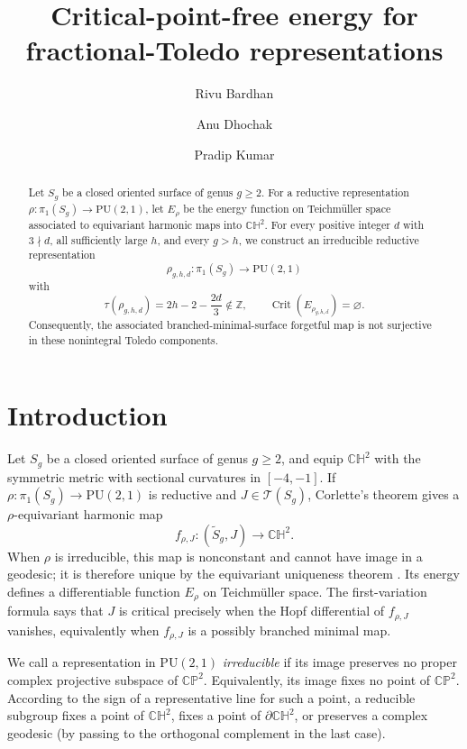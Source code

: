 \documentclass[12pt]{amsart}
\title[Critical-point-free energy]{Critical-point-free energy for\\
fractional-Toledo representations}
\author[R. Bardhan]{Rivu Bardhan}
\author[A. Dhochak]{Anu Dhochak}
\author[P. Kumar]{Pradip Kumar}
\date{}
\theoremstyle{remark}
\newcommand{\CH}{\mathbb{CH}}
\newcommand{\Teich}{\mathcal T}
\newcommand{\PU}{\mathrm{PU}}
\begin{document}
\begin{abstract}
Let $S_g$ be a closed oriented surface of genus $g\ge2$.  For a reductive
representation $\rho:\pi_1(S_g)\to\PU(2,1)$, let $E_\rho$ be the energy
function on Teichm\"uller space associated to equivariant harmonic maps into
$\CH^2$.  For every positive integer $d$ with $3\nmid d$, all sufficiently
large $h$, and every $g>h$, we construct an irreducible reductive
representation
\[
\rho_{g,h,d}:\pi_1(S_g)\to\PU(2,1)
\]
with
\[
\tau(\rho_{g,h,d})=2h-2-\frac{2d}{3}\notin\mathbb Z,
\qquad
\operatorname{Crit}(E_{\rho_{g,h,d}})=\varnothing.
\]
Consequently, the associated branched-minimal-surface forgetful map is not
surjective in these nonintegral Toledo components.
\end{abstract}

\maketitle

\section{Introduction}

Let $S_g$ be a closed oriented surface of genus $g\ge2$, and equip
$\CH^2$ with the symmetric metric with sectional curvatures in
$[-4,-1]$. 
If $\rho:\pi_1(S_g)\to\PU(2,1)$ is reductive and
$J\in\Teich(S_g)$, Corlette's theorem
\cite[Corollary~3.5]{Corlette} gives a $\rho$-equivariant harmonic map
\[
 f_{\rho,J}:(\widetilde S_g,J)\longrightarrow\CH^2.
\]
When $\rho$ is irreducible, this map is nonconstant and cannot have image in a
geodesic; it is therefore unique by the equivariant uniqueness theorem
\cite[Theorem~3.2]{DaskalopoulosWentworth}.  Its energy defines a
differentiable function $E_\rho$ on Teichm\"uller space.  The first-variation
formula \cite[Theorem~3.11]{DaskalopoulosWentworth} says that $J$ is critical
precisely when the Hopf differential of $f_{\rho,J}$ vanishes, equivalently
when $f_{\rho,J}$ is a possibly branched minimal map.

We call a representation in $\PU(2,1)$ \emph{irreducible} if its image
preserves no proper complex projective subspace of $\mathbb{CP}^2$.
Equivalently, its image fixes no point of $\mathbb{CP}^2$.  According to the
sign of a representative line for such a point, a reducible subgroup fixes a
point of $\CH^2$, fixes a point of $\partial\CH^2$, or preserves a complex
geodesic (by passing to the orthogonal complement in the last case).
\end{document}
